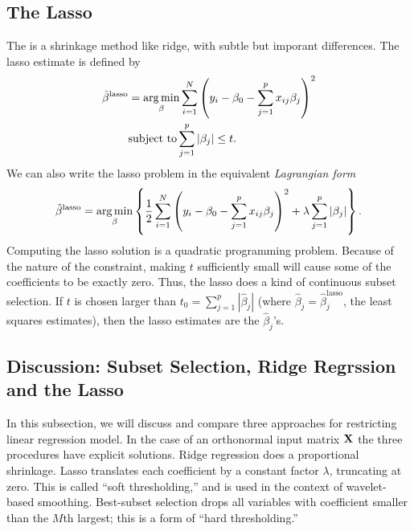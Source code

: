 \documentclass{article}
\begin{document}
\subsection{The Lasso}
The  is a shrinkage method like ridge, with subtle but imporant differences. The lasso estimate is defined by
\begin{equation}
  \begin{split}
  \hat{\beta}^\text{lasso} &= \operatorname*{arg\,min}_\beta \sum_{i=1}^{N}\left( y_i - \beta_0 - \sum_{j=1}^{p}x_{ij}\beta_j \right)^2 \\
  &\text{subject to} \sum_{j=1}^{p}|\beta_j| \le t.
  \end{split}
\end{equation}
We can also write the lasso problem in the equivalent \textit{Lagrangian form}
\begin{equation}
  \label{eq:lasso}
  \hat{\beta}^\text{lasso} = \operatorname*{arg\,min}_\beta \left\{ \frac{1}{2}\sum_{i=1}^{N}\left( y_i - \beta_0 - \sum_{j=1}^{p}x_{ij}\beta_j \right)^2  + \lambda \sum_{j=1}^{p}|\beta_j|\right\} .
\end{equation}
Computing the lasso solution is a quadratic programming problem. Because of the nature of the constraint, making $t$ sufficiently small will cause some of the coefficients to be exactly zero. Thus, the lasso does a kind of continuous subset selection. If $t$ is chosen larger than $t_0 = \sum_{j=1}^{p}|\hat{\beta}_j|$ (where $\hat{\beta}_j = \hat{\beta}_j^\text{lasso}$, the least squares estimates), then the lasso estimates are the $\hat{\beta}_j$'s.

\subsection{Discussion: Subset Selection, Ridge Regrssion and the Lasso}
In this subsection, we will discuss and compare three approaches for restricting linear regression model. In the case of an orthonormal input matrix ${\mathbf{X}}$ the three procedures have explicit solutions. Ridge regression does a proportional shrinkage. Lasso translates each coefficient by a constant factor $\lambda$, truncating at zero. This is called ``soft thresholding,'' and is used in the context of wavelet-based smoothing. Best-subset selection drops all variables with coefficient smaller than the $M$th largest; this is a form of ``hard thresholding.''
\end{document}
